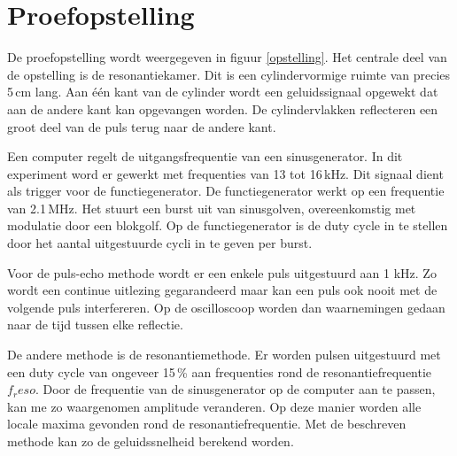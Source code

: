 \section{Proefopstelling}


De proefopstelling wordt weergegeven in figuur \ref{opstelling}. Het centrale 
deel van de opstelling is de resonantiekamer. Dit is een cylindervormige ruimte 
van precies 5\,cm lang. Aan \'e\'en kant van de cylinder wordt een 
geluidssignaal opgewekt dat aan de andere kant kan opgevangen worden. De 
cylindervlakken reflecteren een groot deel van de puls terug naar de andere 
kant. 

Een computer regelt de uitgangsfrequentie van een sinusgenerator. In dit 
experiment word er gewerkt met frequenties van 13 tot 16\,kHz. Dit signaal 
dient als trigger voor de functiegenerator. De functiegenerator werkt op een 
frequentie van 2.1\,MHz. Het stuurt een burst uit van sinusgolven, 
overeenkomstig met modulatie door een blokgolf. Op de functiegenerator is de 
duty cycle in te stellen door het aantal uitgestuurde cycli in te geven per 
burst.

Voor de puls-echo methode wordt er een enkele puls uitgestuurd aan 1 kHz. Zo 
wordt een continue uitlezing gegarandeerd maar kan een puls ook nooit met de 
volgende puls interfereren. Op de oscilloscoop worden dan waarnemingen gedaan 
naar de tijd tussen elke reflectie.

De andere methode is de resonantiemethode. Er worden pulsen uitgestuurd met een 
duty cycle van ongeveer 15\,\% aan frequenties rond de resonantiefrequentie 
$f_reso$. Door de frequentie van de sinusgenerator op de computer aan te 
passen, kan me zo waargenomen amplitude veranderen. Op deze manier worden alle 
locale maxima gevonden rond de resonantiefrequentie. Met de beschreven methode 
kan zo de geluidssnelheid berekend worden. 
